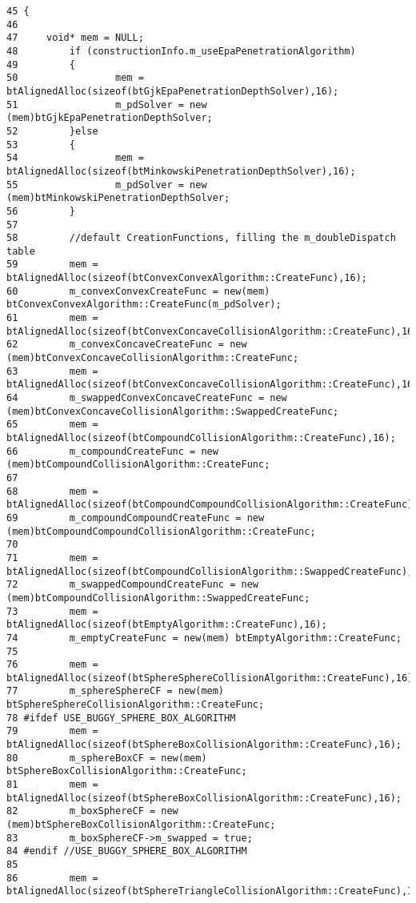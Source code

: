\begin{Code}\begin{verbatim}45 {
46 
47     void* mem = NULL;
48         if (constructionInfo.m_useEpaPenetrationAlgorithm)
49         {
50                 mem = btAlignedAlloc(sizeof(btGjkEpaPenetrationDepthSolver),16);
51                 m_pdSolver = new (mem)btGjkEpaPenetrationDepthSolver;
52         }else
53         {
54                 mem = btAlignedAlloc(sizeof(btMinkowskiPenetrationDepthSolver),16);
55                 m_pdSolver = new (mem)btMinkowskiPenetrationDepthSolver;
56         }
57         
58         //default CreationFunctions, filling the m_doubleDispatch table
59         mem = btAlignedAlloc(sizeof(btConvexConvexAlgorithm::CreateFunc),16);
60         m_convexConvexCreateFunc = new(mem) btConvexConvexAlgorithm::CreateFunc(m_pdSolver);
61         mem = btAlignedAlloc(sizeof(btConvexConcaveCollisionAlgorithm::CreateFunc),16);
62         m_convexConcaveCreateFunc = new (mem)btConvexConcaveCollisionAlgorithm::CreateFunc;
63         mem = btAlignedAlloc(sizeof(btConvexConcaveCollisionAlgorithm::CreateFunc),16);
64         m_swappedConvexConcaveCreateFunc = new (mem)btConvexConcaveCollisionAlgorithm::SwappedCreateFunc;
65         mem = btAlignedAlloc(sizeof(btCompoundCollisionAlgorithm::CreateFunc),16);
66         m_compoundCreateFunc = new (mem)btCompoundCollisionAlgorithm::CreateFunc;
67 
68         mem = btAlignedAlloc(sizeof(btCompoundCompoundCollisionAlgorithm::CreateFunc),16);
69         m_compoundCompoundCreateFunc = new (mem)btCompoundCompoundCollisionAlgorithm::CreateFunc;
70 
71         mem = btAlignedAlloc(sizeof(btCompoundCollisionAlgorithm::SwappedCreateFunc),16);
72         m_swappedCompoundCreateFunc = new (mem)btCompoundCollisionAlgorithm::SwappedCreateFunc;
73         mem = btAlignedAlloc(sizeof(btEmptyAlgorithm::CreateFunc),16);
74         m_emptyCreateFunc = new(mem) btEmptyAlgorithm::CreateFunc;
75         
76         mem = btAlignedAlloc(sizeof(btSphereSphereCollisionAlgorithm::CreateFunc),16);
77         m_sphereSphereCF = new(mem) btSphereSphereCollisionAlgorithm::CreateFunc;
78 #ifdef USE_BUGGY_SPHERE_BOX_ALGORITHM
79         mem = btAlignedAlloc(sizeof(btSphereBoxCollisionAlgorithm::CreateFunc),16);
80         m_sphereBoxCF = new(mem) btSphereBoxCollisionAlgorithm::CreateFunc;
81         mem = btAlignedAlloc(sizeof(btSphereBoxCollisionAlgorithm::CreateFunc),16);
82         m_boxSphereCF = new (mem)btSphereBoxCollisionAlgorithm::CreateFunc;
83         m_boxSphereCF->m_swapped = true;
84 #endif //USE_BUGGY_SPHERE_BOX_ALGORITHM
85 
86         mem = btAlignedAlloc(sizeof(btSphereTriangleCollisionAlgorithm::CreateFunc),16);

\end{verbatim}
\end{Code}
